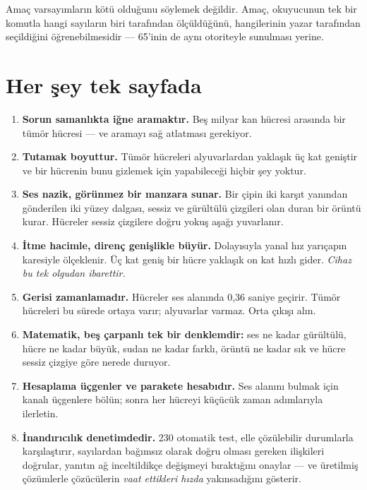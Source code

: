 \documentclass[11pt,a4paper]{article}
\begin{document}
\begin{plain}
Amaç varsayımların kötü olduğunu söylemek değildir. Amaç, okuyucunun tek bir
komutla hangi sayıların biri tarafından ölçüldüğünü, hangilerinin yazar
tarafından seçildiğini öğrenebilmesidir --- 65'inin de aynı otoriteyle sunulması
yerine.
\end{plain}

\clearpage
\section{Her şey tek sayfada}

\begin{enumerate}[leftmargin=*,itemsep=6pt]
\item \textbf{Sorun samanlıkta iğne aramaktır.} Beş milyar kan hücresi arasında
bir tümör hücresi --- ve aramayı sağ atlatması gerekiyor.

\item \textbf{Tutamak boyuttur.} Tümör hücreleri alyuvarlardan yaklaşık üç kat
geniştir ve bir hücrenin bunu gizlemek için yapabileceği hiçbir şey yoktur.

\item \textbf{Ses nazik, görünmez bir manzara sunar.} Bir çipin iki karşıt
yanından gönderilen iki yüzey dalgası, sessiz ve gürültülü çizgileri olan duran
bir örüntü kurar. Hücreler sessiz çizgilere doğru yokuş aşağı yuvarlanır.

\item \textbf{İtme hacimle, direnç genişlikle büyür.} Dolayısıyla yanal hız
yarıçapın karesiyle ölçeklenir. Üç kat geniş bir hücre yaklaşık on kat hızlı
gider. \emph{Cihaz bu tek olgudan ibarettir.}

\item \textbf{Gerisi zamanlamadır.} Hücreler ses alanında 0,36 saniye geçirir.
Tümör hücreleri bu sürede ortaya varır; alyuvarlar varmaz. Orta çıkışı alın.

\item \textbf{Matematik, beş çarpanlı tek bir denklemdir:} ses ne kadar
gürültülü, hücre ne kadar büyük, sudan ne kadar farklı, örüntü ne kadar sık ve
hücre sessiz çizgiye göre nerede duruyor.

\item \textbf{Hesaplama üçgenler ve parakete hesabıdır.} Ses alanını bulmak için
kanalı üçgenlere bölün; sonra her hücreyi küçücük zaman adımlarıyla ilerletin.

\item \textbf{İnandırıcılık denetimdedir.} 230 otomatik test, elle çözülebilir
durumlarla karşılaştırır, sayılardan bağımsız olarak doğru olması gereken
ilişkileri doğrular, yanıtın ağ inceltildikçe değişmeyi bıraktığını onaylar ---
ve üretilmiş çözümlerle çözücülerin \emph{vaat ettikleri hızda} yakınsadığını
gösterir.


\end{enumerate}
\end{document}
